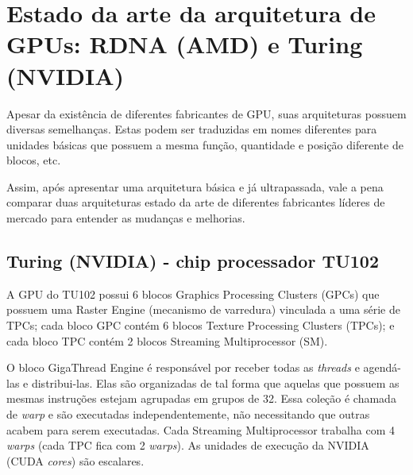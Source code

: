 \documentclass[letterpaper, 10 pt, conference]{ieeeconf}  %
\begin{document}
\begin{comment}
\begin{itemize}
    \item Tesla (novembro de 2006);
    \item Fermi (abril de 2010);
    \item Kepler (abril de 2012);
    \item Maxwell (fevereiro de 2014);
    \item Pascal (abril de 2016);
    \item Volta (dezembro de 2017);
    \item Turing (setembro 2018);
    \item Ampere (lançamento previsto para setembro de 2020)
    \item Hopper (futuramente)
\end{itemize}
\end{comment}





\section{Estado da arte da arquitetura de GPUs: RDNA (AMD) e Turing (NVIDIA)}

Apesar da existência de diferentes fabricantes de GPU, suas arquiteturas possuem diversas semelhanças. Estas podem ser traduzidas em nomes diferentes para unidades básicas que possuem a mesma função, quantidade e posição diferente de blocos, etc.

Assim, após apresentar uma arquitetura básica e já ultrapassada, vale a pena comparar duas arquiteturas estado da arte de diferentes fabricantes líderes de mercado para entender as mudanças e melhorias.

\subsection{Turing (NVIDIA) - chip processador TU102}

A GPU do TU102 possui 6 blocos Graphics Processing Clusters (GPCs) que possuem uma Raster Engine (mecanismo de varredura) vinculada a uma série de TPCs; cada bloco GPC contém 6 blocos Texture Processing Clusters (TPCs); e cada bloco TPC contém 2 blocos Streaming Multiprocessor (SM).

O bloco GigaThread Engine é responsável por receber todas as \textit{threads} e agendá-las e distribui-las. Elas são organizadas de tal forma que aquelas que possuem as mesmas instruções estejam agrupadas em grupos de 32. Essa coleção é chamada de \textit{warp} e são executadas independentemente, não necessitando que outras acabem para serem executadas. Cada Streaming Multiprocessor trabalha com 4 \textit{warps} (cada TPC fica com 2 \textit{warps}). As unidades de execução da NVIDIA (CUDA \textit{cores}) são escalares.
\end{document}

